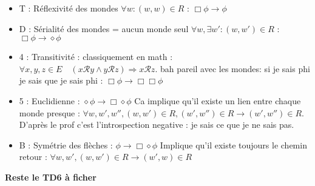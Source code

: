 \documentclass{article}
\theoremstyle{plain}%
\theoremstyle{definition}
\theoremstyle{remark}
\begin{document}
\begin{itemize}
    \item T : Réflexivité des mondes $ \forall w : (w,w) \in R $ : $ \Box \phi \to \phi  $ 
    \item D : Sérialité des mondes = aucun monde seul $ \forall w, \exists w' : (w, w') \in R $  : $ \Box \phi \to \diamond \phi  $ 
    \item 4 : Transitivité : classiquement en math : $ \forall x,y,z\in E\quad (x{\mathcal {R}}y\land y{\mathcal {R}}z)\Rightarrow x{\mathcal {R}}z. $ bah pareil avec les mondes: si je sais phi je sais que je sais phi : $ \Box \phi \to \Box \Box \phi  $ 
    \item 5 : Euclidienne : $ \diamond \phi  \to  \Box \diamond \phi  $ Ca implique qu'il existe un lien entre chaque monde presque : $ \forall w, w', w'', (w, w') \in R, (w',w'') \in R \to (w',w'') \in R $. D'après le prof c'est l'introspection negative : je sais ce que je ne sais pas.
    \item B : Symétrie des flèches : $ \phi \to \Box \diamond \phi  $ Implique qu'il existe toujours le chemin retour : $ \forall w, w', (w,w') \in R \to (w',w) \in R $ 
\end{itemize}
\textbf{Reste le TD6 à ficher}
\end{document}
